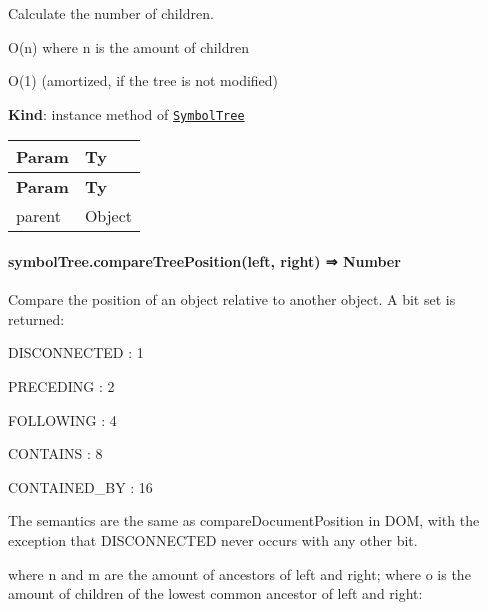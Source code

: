 Calculate the number of children.


\begin{DoxyItemize}
\item {\ttfamily O(n)} where {\ttfamily n} is the amount of children
\item {\ttfamily O(1)} (amortized, if the tree is not modified)
\end{DoxyItemize}

{\bfseries Kind}\+: instance method of {\ttfamily \href{#exp_module_symbol-tree--SymbolTree}{\tt Symbol\+Tree}}

\tabulinesep=1mm
\begin{longtabu} spread 0pt [c]{*{2}{|X[-1]}|}
\hline
\rowcolor{\tableheadbgcolor}\textbf{ Param  }&\textbf{ Ty   }\\
\endfirsthead
\hline
\endfoot
\hline
\rowcolor{\tableheadbgcolor}\textbf{ Param  }&\textbf{ Ty   }\\
\endhead
parent  &{\ttfamily Object}   \\
\end{longtabu}


\label{_module_symbol-tree--SymbolTree+compareTreePosition}%


\paragraph*{symbol\+Tree.\+compare\+Tree\+Position(left, right) ⇒ {\ttfamily Number}}

Compare the position of an object relative to another object. A bit set is returned\+:


\begin{DoxyItemize}
\item D\+I\+S\+C\+O\+N\+N\+E\+C\+T\+ED \+: 1 
\item P\+R\+E\+C\+E\+D\+I\+NG \+: 2 
\item F\+O\+L\+L\+O\+W\+I\+NG \+: 4 
\item C\+O\+N\+T\+A\+I\+NS \+: 8 
\item C\+O\+N\+T\+A\+I\+N\+E\+D\+\_\+\+BY \+: 16 
\end{DoxyItemize}

The semantics are the same as compare\+Document\+Position in D\+OM, with the exception that D\+I\+S\+C\+O\+N\+N\+E\+C\+T\+ED never occurs with any other bit.

where {\ttfamily n} and {\ttfamily m} are the amount of ancestors of {\ttfamily left} and {\ttfamily right}; where {\ttfamily o} is the amount of children of the lowest common ancestor of {\ttfamily left} and {\ttfamily right}\+:


